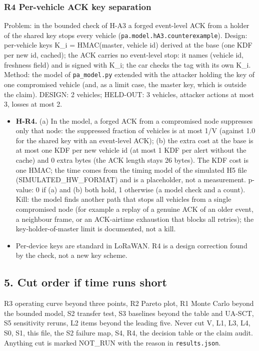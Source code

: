 \subsubsection*{R4 Per-vehicle ACK key separation}
Problem: in the bounded check of H-A3 a forged event-level ACK from a holder of the shared key stops every vehicle (\texttt{pa.model.hA3.counterexample}). Design: per-vehicle keys K\_i = HMAC(master, vehicle id) derived at the base (one KDF per new id, cached); the ACK carries no event-level stop: it names (vehicle id, freshness field) and is signed with K\_i; the car checks the tag with its own K\_i. Method: the model of \texttt{pa\_model.py} extended with the attacker holding the key of one compromised vehicle (and, as a limit case, the master key, which is outside the claim). DESIGN: 2 vehicles; HELD-OUT: 3 vehicles, attacker actions at most 3, losses at most 2.
\begin{itemize}
\item \textbf{H-R4.} (a) In the model, a forged ACK from a compromised node suppresses only that node: the suppressed fraction of vehicles is at most 1/V (against 1.0 for the shared key with an event-level ACK); (b) the extra cost at the base is at most one KDF per new vehicle id (at most 1 KDF per alert without the cache) and 0 extra bytes (the ACK length stays 26 bytes). The KDF cost is one HMAC; the time comes from the timing model of the simulated H5 file (SIMULATED\_HW\_FORMAT) and is a placeholder, not a measurement. p-value: 0 if (a) and (b) both hold, 1 otherwise (a model check and a count). Kill: the model finds another path that stops all vehicles from a single compromised node (for example a replay of a genuine ACK of an older event, a neighbour frame, or an ACK-airtime exhaustion that blocks all retries); the key-holder-of-master limit is documented, not a kill.
\item Per-device keys are standard in LoRaWAN. R4 is a design correction found by the check, not a new key scheme.
\end{itemize}

\subsection*{5. Cut order if time runs short}
R3 operating curve beyond three points, R2 Pareto plot, R1 Monte Carlo beyond the bounded model, S2 transfer test, S3 baselines beyond the table and UA-SCT, S5 sensitivity reruns, L2 items beyond the leading five. Never cut V, L1, L3, L4, S0, S1, this file, the S2 failure map, S4, R4, the decision table or the claim audit. Anything cut is marked NOT\_RUN with the reason in \texttt{results.json}.

